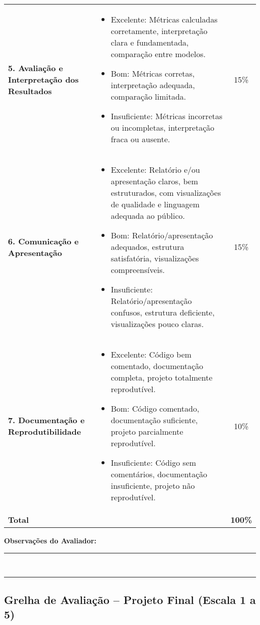 \documentclass[12pt]{article}
\begin{document}
\begin{center}
\begin{tabular}{p{4cm} p{7cm} c}
\textbf{5. Avaliação e Interpretação dos Resultados} &
\begin{itemize}[leftmargin=*]
  \item Excelente: Métricas calculadas corretamente, interpretação clara e fundamentada, comparação entre modelos.
  \item Bom: Métricas corretas, interpretação adequada, comparação limitada.
  \item Insuficiente: Métricas incorretas ou incompletas, interpretação fraca ou ausente.
\end{itemize}
& 15\% \\

\textbf{6. Comunicação e Apresentação} &
\begin{itemize}[leftmargin=*]
  \item Excelente: Relatório e/ou apresentação claros, bem estruturados, com visualizações de qualidade e linguagem adequada ao público.
  \item Bom: Relatório/apresentação adequados, estrutura satisfatória, visualizações compreensíveis.
  \item Insuficiente: Relatório/apresentação confusos, estrutura deficiente, visualizações pouco claras.
\end{itemize}
& 15\% \\

\textbf{7. Documentação e Reprodutibilidade} &
\begin{itemize}[leftmargin=*]
  \item Excelente: Código bem comentado, documentação completa, projeto totalmente reprodutível.
  \item Bom: Código comentado, documentação suficiente, projeto parcialmente reprodutível.
  \item Insuficiente: Código sem comentários, documentação insuficiente, projeto não reprodutível.
\end{itemize}
& 10\% \\

\midrule
\textbf{Total} & & \textbf{100\%} \\
\bottomrule
\end{tabular}
\end{center}

\textbf{Observações do Avaliador:} \\
\rule{\textwidth}{0.4pt} \\
\vspace{1cm}
\rule{\textwidth}{0.4pt}


\subsection*{Grelha de Avaliação – Projeto Final (Escala 1 a 5)}
\end{document}
